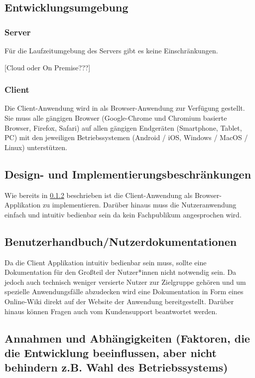 \subsection{Entwicklungsumgebung}

\subsubsection{Server}

Für die Laufzeitumgebung des Servers gibt es keine Einschränkungen.

[Cloud oder On Premise???]

\subsubsection{Client}
\label{subsec:OEclient}
    Die Client-Anwendung wird in als Browser-Anwendung zur Verfügung gestellt. Sie muss alle gängigen Browser (Google-Chrome und Chromium basierte Browser, Firefox, Safari) auf allen gängigen Endgeräten (Smartphone, Tablet, PC) mit den jeweiligen Betriebssystemen (Android / iOS, Windows / MacOS / Linux) unterstützen.

\subsection{Design- und Implementierungsbeschränkungen}

Wie bereits in \ref{subsec:OEclient} beschrieben ist die Client-Anwendung als Browser-Applikation zu implementieren. Darüber hinaus muss die Nutzeranwendung einfach und intuitiv bedienbar sein da kein Fachpublikum angesprochen wird.

\subsection{Benutzerhandbuch/Nutzerdokumentationen}

    Da die Client Applikation intuitiv bedienbar sein muss, sollte eine Dokumentation für den Großteil der Nutzer*innen nicht notwendig sein. Da jedoch auch technisch weniger versierte Nutzer zur Zielgruppe gehören und um spezielle Anwendungsfälle abzudecken wird eine Dokumentation in Form eines Online-Wiki direkt auf der Website der Anwendung bereitgestellt. Darüber hinaus können Fragen auch vom Kundensupport beantwortet werden. 

\subsection{Annahmen und Abhängigkeiten (Faktoren, die die Entwicklung beeinflussen, aber nicht behindern z.B. Wahl des Betriebssystems)}

